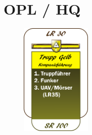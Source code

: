 \section{\acf{OPL} / \acf{HQ}}
\begin{figure}
	\centering 
	\includegraphics[width=0.3\textwidth]{../img/truppenordnung/opl/opl}
\end{figure}	

